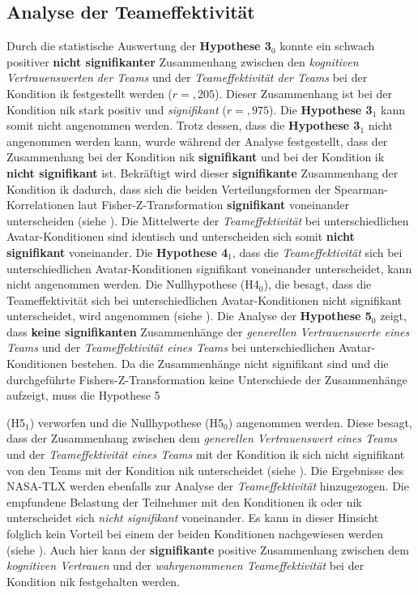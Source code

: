 \documentclass[a4paper,11pt]{article}%
\renewcommand{\\}{\vspace*{0.5\baselineskip} \newline}
\begin{document}
{\subsection{Analyse der Teameffektivität}
\label{AnalyseTE}
Durch die statistische Auswertung der \textbf{Hypothese 3$_{0}$} konnte ein schwach positiver \textbf{nicht signifikanter} Zusammenhang zwischen den \textit{kognitiven Vertrauenswerten der Teams} und der \textit{Teameffektivität der Teams} bei der Kondition \ac{ik} festgestellt werden ($r=,205$). Dieser Zusammenhang ist bei der Kondition \ac{nik} stark positiv und \textit{signifikant} ($r=,975$). Die \textbf{Hypothese 3$_{1}$} kann somit nicht angenommen werden.\newline
Trotz dessen, dass die \textbf{Hypothese 3$_{1}$} nicht angenommen werden kann, wurde während der Analyse festgestellt, dass der Zusammenhang bei der Kondition \ac{nik} \textbf{signifikant} und bei der Kondition \ac{ik} \textbf{nicht signifikant} ist. Bekräftigt wird dieser \textbf{signifikante} Zusammenhang der Kondition \ac{ik} dadurch, dass sich die beiden Verteilungsformen der Spearman-Korrelationen laut Fisher-Z-Transformation \textbf{signifikant} voneinander unterscheiden (siehe ).\newpage
Die Mittelwerte der \textit{Teameffektivität} bei unterschiedlichen Avatar-Konditionen sind identisch und unterscheiden sich somit \textbf{nicht signifikant} voneinander. Die \textbf{Hypothese 4$_{1}$}, dass die \textit{Teameffektivität} sich bei unterschiedlichen Avatar-Konditionen signifikant voneinander unterscheidet, kann nicht angenommen werden. Die Nullhypothese (H4$_{0}$), die besagt, dass die Teameffektivität sich bei unterschiedlichen Avatar-Konditionen nicht signifikant unterscheidet, wird angenommen (siehe ).\\
Die Analyse der \textbf{Hypothese 5$_{0}$} zeigt, dass \textbf{keine signifikanten} Zusammenhänge der \textit{generellen Vertrauenswerte eines Teams} und der \textit{Teameffektivität eines Teams} bei unterschiedlichen Avatar-Konditionen bestehen. Da die Zusammenhänge nicht signifikant sind und die durchgeführte Fishers-Z-Transformation keine Unterschiede der Zusammenhänge aufzeigt, muss die Hypothese 5 {(H5$_{1}$) verworfen und die Nullhypothese (H5$_{0}$) angenommen werden. Diese besagt, dass der Zusammenhang zwischen dem \textit{generellen Vertrauenswert eines Teams} und der \textit{Teameffektivität eines Teams} mit der Kondition \ac{ik} sich nicht signifikant von den Teams mit der Kondition \ac{nik} unterscheidet (siehe ).\\
Die Ergebnisse des NASA-TLX werden ebenfalls zur Analyse der \textit{Teameffektivität} hinzugezogen. Die empfundene Belastung der Teilnehmer mit den Konditionen \ac{ik} oder \newline \ac{nik} unterscheidet sich \textit{nicht signifikant} voneinander. Es kann in dieser Hinsicht folglich kein Vorteil bei einem der beiden Konditionen nachgewiesen werden (siehe ).
Auch hier kann der \textbf{signifikante} positive Zusammenhang zwischen dem \textit{kognitiven Vertrauen} und der \textit{wahrgenommenen Teameffektivität} bei der Kondition \ac{nik} festgehalten werden.

}}
\end{document}
